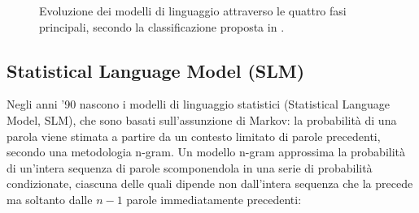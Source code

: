 \begin{figure}[h]
    \centering
    \caption{Evoluzione dei modelli di linguaggio attraverso le quattro fasi principali, secondo la classificazione proposta in \cite{zhao2023survey}.}
    \label{fig:evoluzione-lm}
\end{figure}



\subsection{Statistical Language Model (SLM)}
Negli anni '90 nascono i modelli di linguaggio statistici (Statistical Language Model, SLM), che sono basati sull'assunzione di Markov: 
la probabilità di una parola viene stimata a partire da un contesto limitato di parole precedenti, secondo una metodologia n-gram. 
Un modello n-gram approssima la probabilità di un'intera sequenza di parole scomponendola in una serie di probabilità condizionate, 
ciascuna delle quali dipende non dall'intera sequenza che la precede ma soltanto dalle $n-1$ parole immediatamente precedenti:

